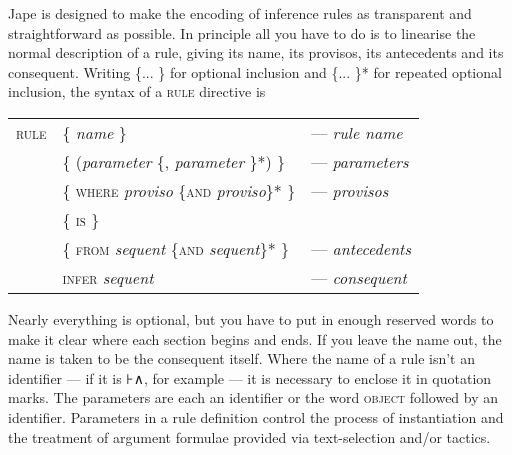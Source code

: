 Jape is designed to make the encoding of inference rules as transparent and straightforward as possible. In principle all you have to do is to linearise the normal description of a rule, giving its name, its provisos, its antecedents and its consequent. Writing \{... \} for optional inclusion and \{... \}* for repeated optional inclusion, the syntax of a \textsc{rule} directive is

\begin{tabular}{lll}
\textsc{rule} & \{ \textit{name} \} & --- \textit{rule name}\\
 & \{ (\textit{parameter} \{, \textit{parameter} \}*) \} & --- \textit{parameters}\\
 & \{ \textsc{where} \textit{proviso} \{\textsc{and} \textit{proviso}\}* \} & --- \textit{provisos}\\
 & \{ \textsc{is} \}\\
 & \{ \textsc{from} \textit{sequent} \{\textsc{and} \textit{sequent}\}* \} & --- \textit{antecedents}\\
 & \textsc{infer} \textit{sequent} & --- \textit{consequent}
\end{tabular}

Nearly everything is optional, but you have to put in enough reserved words to make it clear where each section begins and ends. If you leave the name out, the name is taken to be the consequent itself. Where the name of a rule isn't an identifier --- if it is ⊦∧, for example --- it is necessary to enclose it in quotation marks. The parameters are each an identifier or the word \textsc{object} followed by an identifier. Parameters in a rule definition control the process of instantiation and the treatment of argument formulae provided via text-selection and/or tactics.

